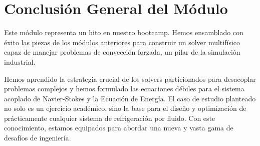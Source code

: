 \section{Conclusión General del Módulo}
Este módulo representa un hito en nuestro bootcamp. Hemos ensamblado con éxito las piezas de los módulos anteriores para construir un solver multifísico capaz de manejar problemas de convección forzada, un pilar de la simulación industrial.

Hemos aprendido la estrategia crucial de los solvers particionados para desacoplar problemas complejos y hemos formulado las ecuaciones débiles para el sistema acoplado de Navier-Stokes y la Ecuación de Energía. El caso de estudio planteado no solo es un ejercicio académico, sino la base para el diseño y optimización de prácticamente cualquier sistema de refrigeración por fluido. Con este conocimiento, estamos equipados para abordar una nueva y vasta gama de desafíos de ingeniería.

